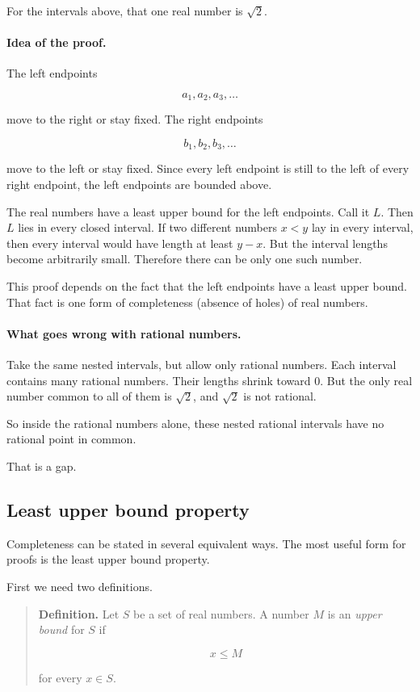 For the intervals above, that one real number is \(\sqrt2\).

\paragraph{Idea of the proof.}
The left endpoints

\[
a_1,a_2,a_3,\ldots
\]

move to the right or stay fixed. The right endpoints

\[
b_1,b_2,b_3,\ldots
\]

move to the left or stay fixed. Since every left endpoint is still to the left of every right endpoint, the left endpoints are bounded above.

The real numbers have a least upper bound for the left endpoints. Call it \(L\). Then \(L\) lies in every closed interval. If two different numbers \(x<y\) lay in every interval, then every interval would have length at least \(y-x\). But the interval lengths become arbitrarily small. Therefore there can be only one such number.

This proof depends on the fact that the left endpoints have a least upper bound. That fact is one form of completeness (absence of holes) of real numbers.

\paragraph{What goes wrong with rational numbers.}
Take the same nested intervals, but allow only rational numbers. Each interval contains many rational numbers. Their lengths shrink toward \(0\). But the only real number common to all of them is \(\sqrt2\), and \(\sqrt2\) is not rational.

So inside the rational numbers alone, these nested rational intervals have no rational point in common.

That is a gap.

\subsection{Least upper bound property}
\label{subsec:least-upper-bound}

Completeness can be stated in several equivalent ways. The most useful form for proofs is the least upper bound property.

First we need two definitions.

\begin{quote}
\textbf{Definition.}
Let \(S\) be a set of real numbers. A number \(M\) is an \emph{upper bound} for \(S\) if

\[
x\le M
\]

for every \(x\in S\).
\end{quote}

